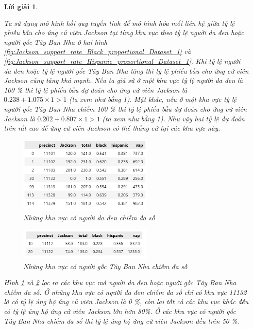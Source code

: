 \documentclass[14pt, a4paper]{article}
\theoremstyle{sltheorem}
\theoremstyle{soltheorem}
\newtheorem*{loigiai}{Lời giải}
\begin{document}
\begin{loigiai}
\begin{enumerate}
    Ta sử dụng mô hình hồi quy tuyến tính để mô hình hóa mối liên hệ giữa tỷ lệ phiếu bầu cho ứng cử viên Jackson tại từng khu vực theo tỷ lệ người da đen hoặc người gốc Tây Ban Nha ở hai hình \ref{fig:Jackson_support_rate_Black_proportional_Dataset_1} và \ref{fig:Jackson_support_rate_Hispanic_proportional_Dataset_1}.
    Khi tỷ lệ người da đen hoặc tỷ lệ người gốc Tây Ban Nha tăng thì tỷ lệ phiếu bầu cho ứng cử viên Jackson cũng tăng khá mạnh.
    Nếu ta giả sử ở một khu vực tỷ lệ người da đen là 100 \% thì tỷ lệ phiếu bầu dự đoán cho ứng cử viên Jackson là $0.238 + 1.075 \times 1 > 1$ (ta xem như bằng 1).
    Mặt khác, nếu ở một khu vực tỷ lệ người gốc Tây Ban Nha chiếm 100 \% thì tỷ lệ phiếu bầu dự đoán cho ứng cử viên Jackson là $0.202+0.807 \times 1 > 1$ (ta xem như bằng 1).
    Như vậy hai tỷ lệ dự đoán trên rất cao để ứng cử viên Jackson có thể thắng cử tại các khu vực này.

    \begin{figure}[H]
        \centering
        \includegraphics[width=0.6\textwidth]{figures/Predominant_black.png}
        \caption{Những khu vực có người da đen chiếm đa số}
        \label{fig:Predominant_black}
    \end{figure}

    \begin{figure}[H]
        \centering
        \includegraphics[width=0.6\textwidth]{figures/Predominant_hispanic.png}
        \caption{Những khu vực có người gốc Tây Ban Nha chiếm đa số}
        \label{fig:Predominant_hispanic}
    \end{figure}

    Hình \ref{fig:Predominant_black} và \ref{fig:Predominant_hispanic} lọc ra các khu vực mà người da đen hoặc người gốc Tây Ban Nha chiếm đa số.
    Ở những khu vực có người da đen chiếm đa số chỉ có khu vực 11132 là có tỷ lệ ủng hộ ứng cử viên Jackson là 0 \%, còn lại tất cả các khu vực khác đều có tỷ lệ ủng hộ ứng cử viên Jackson lớn hơn 80\%.
    Ở các khu vực có người gốc Tây Ban Nha chiếm đa số thì tỷ lệ ủng hộ ứng cử viên Jackson đều trên 50 \%.


\end{enumerate}
\end{loigiai}
\end{document}

